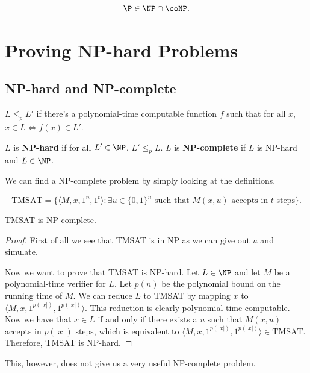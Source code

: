 \begin{theorem}
	\[\P \in \NP \cap \coNP.\]
\end{theorem}

\chapter{Proving NP-hard Problems}

\section{NP-hard and NP-complete}

\begin{definition}
	$L \le_p L'$ if there's a polynomial-time computable function $f$ such that for all $x$, $x \in L \iff f(x) \in L'$.
\end{definition}

\begin{definition}
	$L$ is \textbf{NP-hard} if for all $L' \in \NP$, $L' \le_p L$. $L$ is \textbf{NP-complete} if $L$ is NP-hard and $L \in \NP$.
\end{definition}

We can find a NP-complete problem by simply looking at the definitions.

\begin{problem}[TMSAT]
	\[\text{TMSAT} = \{\langle M, x, 1^n, 1^t\rangle : \exists u\in \{0,1\}^n \text{ such that } M(x,u) \text{ accepts in } t \text{ steps}\}.\]
\end{problem}
\begin{theorem}
	TMSAT is NP-complete.
\end{theorem}
\begin{proof}
	First of all we see that TMSAT is in NP as we can give out $u$ and simulate.

	Now we want to prove that TMSAT is NP-hard. Let $L \in \NP$ and let $M$ be a polynomial-time verifier for $L$. Let $p(n)$ be the polynomial bound on the running time of $M$. We can reduce $L$ to TMSAT by mapping $x$ to $\langle M, x, 1^{p(|x|)}, 1^{p(|x|)}\rangle$. This reduction is clearly polynomial-time computable.
	Now we have that $x \in L$ if and only if there exists a $u$ such that $M(x,u)$ accepts in $p(|x|)$ steps, which is equivalent to $\langle M, x, 1^{p(|x|)}, 1^{p(|x|)}\rangle \in \text{TMSAT}$. Therefore, TMSAT is NP-hard.
\end{proof}

This, however, does not give us a very useful NP-complete problem.

